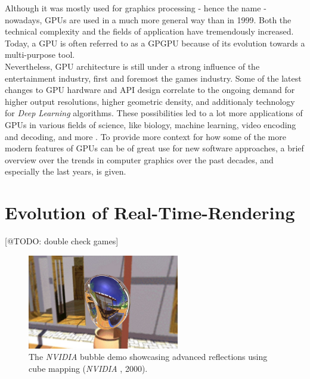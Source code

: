 \noindent
Although it was mostly used for graphics processing - hence the name - nowadays, \ac{GPU}s are used 
in a much more general way than in 1999. Both the technical complexity and the fields of application 
have tremendously increased. Today, a \ac{GPU} is often referred to as a \ac{GPGPU} because of its 
evolution towards a multi-purpose tool. \\

\noindent
Nevertheless, \ac{GPU} architecture is still under a strong influence of the entertainment 
industry, first and foremost the games industry. Some of the latest changes to \ac{GPU} 
hardware and \ac{API} design correlate to the ongoing demand for higher output resolutions, 
higher geometric density, and additionaly technology for \emph{Deep Learning} algorithms. 
These possibilities led to a lot more applications of \ac{GPU}s in various fields of science, 
like biology, machine learning, video encoding and decoding, and more \cite{Battaglia2024}.
To provide more context for how some of the more modern features of \ac{GPU}s can be of great 
use for new software approaches, a brief overview over the trends in computer graphics over 
the past decades, and especially the last years, is given.


\section{Evolution of Real-Time-Rendering} \label{sec-evolution-of-real-time-rendering}
[@TODO: double check games]

\begin{figure}[h]
    \centering
    \includegraphics[width=250px]{images/graphics/bubble-reflection-effects-demo.jpg}
    \caption{The \emph{NVIDIA} bubble demo showcasing advanced reflections using cube mapping (\emph{NVIDIA} \cite{NVIDIABubble}, 2000).}
    \label{fig:bubble-reflection-demo}
\end{figure}

